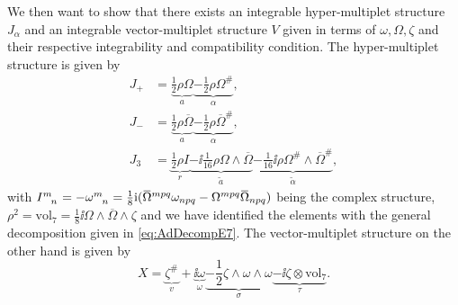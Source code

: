 
We then want to show that there exists an integrable hyper-multiplet structure $J_\alpha$ and an integrable vector-multiplet structure $V$ given in terms of ${\omega,\Omega,\zeta}$ and their respective integrability and compatibility condition. The hyper-multiplet structure is given by
\begin{equation}\label{eq:HyperMultipletStructureCalabiYau}
    \begin{aligned}
        J_+ &= \underbrace{\frac{1}{2}\rho\Omega}_{a} \underbrace{-\frac{1}{2}\rho\Omega^{\#}}_{\alpha},\\
        J_- &= \underbrace{\frac{1}{2}\rho\overbar{\Omega}}_{a} \underbrace{-\frac{1}{2}\rho\overbar{\Omega}^{\#}}_{\alpha},\\
        J_3 &= \underbrace{\frac{1}{2}\rho I}_{r}\underbrace{-\ii\frac{1}{16}\rho\Omega\wedge\overbar{\Omega}}_{\tilde{a}}\underbrace{-\frac{1}{16}\ii\rho\Omega^{\#}\wedge\overbar{\Omega}^{\#}}_{\tilde{\alpha}},
    \end{aligned}
\end{equation}
with $\tensor{I}{^m_n}=-\tensor{\omega}{^m_n}=\frac{1}{8}\ii (\overbar{\Omega}^{mpq}\omega_{npq}-\Omega^{mpq}\overbar{\Omega}_{npq})$ being the complex structure, $\rho^2=\text{vol}_7=\frac{1}{8}\ii\Omega\wedge\overbar{\Omega}\wedge\zeta$ and we have identified the elements with the general decomposition given in \eqref{eq:AdDecompE7}. The vector-multiplet structure on the other hand is given by 
\begin{equation}\label{eq:VectorMultipletStructureCalabiYau}
    X = \underbrace{\zeta^{\#}}_{v}+\underbrace{\ii\omega}_{\omega}\underbrace{-\frac{1}{2}\zeta\wedge\omega\wedge\omega}_{\sigma}\underbrace{-\ii\zeta\otimes\text{vol}_7}_{\tau}.
\end{equation}

